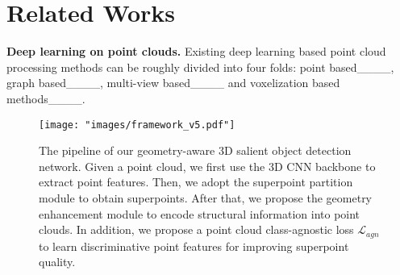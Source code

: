 \section{Related Works}
\textbf{Deep learning on point clouds.} Existing deep learning based point cloud processing methods can be roughly divided into four folds: point based____, graph based____, multi-view based____ and voxelization based methods____.
\begin{figure*}[t!]
	\vspace{-15pt}
	\centering
	\texttt{[image: "images/framework\_v5.pdf"]}
	\caption{The pipeline of our geometry-aware 3D salient object detection network. Given a point cloud, we first use the 3D CNN backbone to extract point features. Then, we adopt the superpoint partition module to obtain superpoints. After that, we propose the geometry enhancement module to encode structural information into point clouds. In addition, we propose a point cloud class-agnostic loss $\mathcal{L}_{agn}$ to learn discriminative point features for improving superpoint quality.}
	\label{fig:framework}
	\vspace{-10pt}
\end{figure*}
